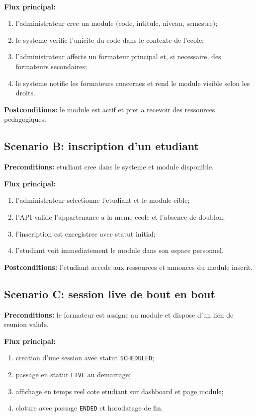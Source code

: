 ﻿﻿\documentclass[12pt,a4paper,oneside]{report}
\begin{document}
\textbf{Flux principal:}
\begin{enumerate}
  \item l'administrateur cree un module (code, intitule, niveau, semestre);
  \item le systeme verifie l'unicite du code dans le contexte de l'ecole;
  \item l'administrateur affecte un formateur principal et, si necessaire, des formateurs secondaires;
  \item le systeme notifie les formateurs concernes et rend le module visible selon les droits.
\end{enumerate}

\textbf{Postconditions:} le module est actif et pret a recevoir des ressources pedagogiques.

\subsection{Scenario B: inscription d'un etudiant}

\textbf{Preconditions:} etudiant cree dans le systeme et module disponible.

\textbf{Flux principal:}
\begin{enumerate}
  \item l'administrateur selectionne l'etudiant et le module cible;
  \item l'API valide l'appartenance a la meme ecole et l'absence de doublon;
  \item l'inscription est enregistree avec statut initial;
  \item l'etudiant voit immediatement le module dans son espace personnel.
\end{enumerate}

\textbf{Postconditions:} l'etudiant accede aux ressources et annonces du module inscrit.

\subsection{Scenario C: session live de bout en bout}

\textbf{Preconditions:} le formateur est assigne au module et dispose d'un lien de reunion valide.

\textbf{Flux principal:}
\begin{enumerate}
  \item creation d'une session avec statut \texttt{SCHEDULED};
  \item passage en statut \texttt{LIVE} au demarrage;
  \item affichage en temps reel cote etudiant sur dashboard et page module;
  \item cloture avec passage \texttt{ENDED} et horodatage de fin.
\end{enumerate}
\end{document}
